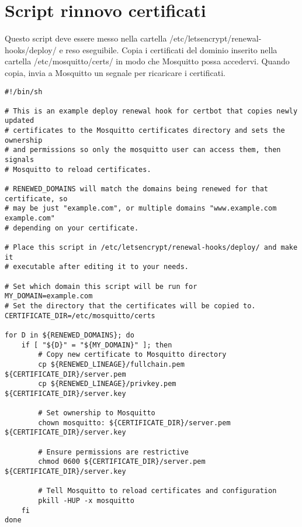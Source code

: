 \section{Script rinnovo certificati}
\label{sec:script-rinnovo-certificati}
Questo script deve essere messo nella cartella /etc/letsencrypt/renewal-hooks/deploy/ e reso eseguibile.
Copia i certificati del dominio inserito nella cartella /etc/mosquitto/certs/ in modo che Mosquitto possa accedervi.
Quando copia, invia a Mosquitto un segnale per ricaricare i certificati.
\begin{lstlisting}[caption={mosquitto-copy.sh},language=text]
#!/bin/sh

# This is an example deploy renewal hook for certbot that copies newly updated
# certificates to the Mosquitto certificates directory and sets the ownership
# and permissions so only the mosquitto user can access them, then signals
# Mosquitto to reload certificates.

# RENEWED_DOMAINS will match the domains being renewed for that certificate, so
# may be just "example.com", or multiple domains "www.example.com example.com"
# depending on your certificate.

# Place this script in /etc/letsencrypt/renewal-hooks/deploy/ and make it
# executable after editing it to your needs.

# Set which domain this script will be run for
MY_DOMAIN=example.com
# Set the directory that the certificates will be copied to.
CERTIFICATE_DIR=/etc/mosquitto/certs

for D in ${RENEWED_DOMAINS}; do
	if [ "${D}" = "${MY_DOMAIN}" ]; then
		# Copy new certificate to Mosquitto directory
		cp ${RENEWED_LINEAGE}/fullchain.pem ${CERTIFICATE_DIR}/server.pem
		cp ${RENEWED_LINEAGE}/privkey.pem ${CERTIFICATE_DIR}/server.key

		# Set ownership to Mosquitto
		chown mosquitto: ${CERTIFICATE_DIR}/server.pem ${CERTIFICATE_DIR}/server.key

		# Ensure permissions are restrictive
		chmod 0600 ${CERTIFICATE_DIR}/server.pem ${CERTIFICATE_DIR}/server.key

		# Tell Mosquitto to reload certificates and configuration
		pkill -HUP -x mosquitto
	fi
done
\end{lstlisting}